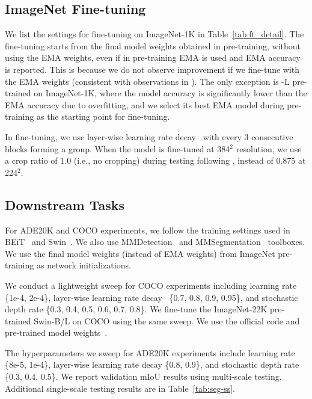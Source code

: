 \subsection{ImageNet Fine-tuning} 
\label{subsec:ft-setting}
We list the settings for fine-tuning on ImageNet-1K in Table~\ref{tab:ft_detail}. The fine-tuning starts from the final model weights obtained in pre-training, without using the EMA weights, even if in pre-training EMA is used and EMA accuracy is reported. This is because we do not observe improvement if we fine-tune with the EMA weights (consistent with observations in \cite{Touvron2020}). The only exception is \cnn{}-L pre-trained on ImageNet-1K, where the model accuracy is significantly lower than the EMA accuracy due to overfitting, and we select its best EMA model during pre-training as the starting point for fine-tuning.

In fine-tuning, we use layer-wise learning rate decay~\cite{Clark2020,Bao2021} with every 3 consecutive blocks forming a group. When the model is fine-tuned at 384$^2$ resolution, we use a crop ratio of 1.0 (i.e., no cropping) during testing following \cite{rw2019timm,Touvron2021GoingDW,swincode}, instead of 0.875 at 224$^2$.



\subsection{Downstream Tasks}
\label{subsec:downstream-setting}

For ADE20K and COCO experiments, we follow the training settings used in BEiT~\cite{Bao2021} and Swin~\cite{Liu2021swin}. We also use MMDetection~\cite{mmdetection} and MMSegmentation~\cite{mmseg2020} toolboxes. We use the final model weights (instead of EMA weights) from ImageNet pre-training as network initializations. 

We conduct a lightweight sweep for COCO experiments including learning rate \{1e-4, 2e-4\}, layer-wise learning rate decay~\cite{Bao2021} \{0.7, 0.8, 0.9, 0.95\}, and stochastic depth rate \{0.3, 0.4, 0.5, 0.6, 0.7, 0.8\}. We fine-tune the ImageNet-22K pre-trained Swin-B/L on COCO using the same sweep. We use the official code and pre-trained model weights~\cite{swindetcode}.

The hyperparameters we sweep for ADE20K experiments include learning rate \{8e-5, 1e-4\}, layer-wise learning rate decay \{0.8, 0.9\}, and stochastic depth rate \{0.3, 0.4, 0.5\}. We report validation mIoU results using multi-scale testing. Additional single-scale testing results are in Table~\ref{tab:seg-ss}.

